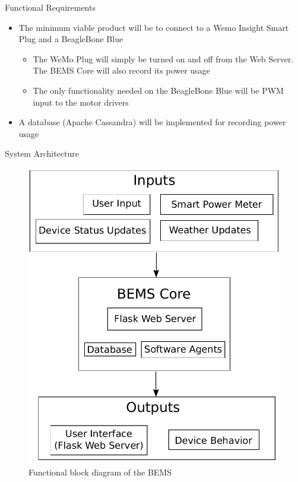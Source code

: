 \documentclass{beamer}
\begin{document}
\begin{frame}{Functional Requirements}{}
    \begin{itemize}
        \item The minimum viable product will be to connect to a Wemo Insight Smart Plug and a BeagleBone Blue
        \begin{itemize}
            \item The WeMo Plug will simply be turned on and off from the Web Server. The BEMS Core will also record its power usage
            \item The only functionality needed on the BeagleBone Blue will be PWM input to the motor drivers
        \end{itemize}
        \item A database (Apache Cassandra) will be implemented for recording power usage
    \end{itemize}
\end{frame}

\begin{frame}{System Architecture}{}
    \begin{figure}
        \centering
        \includegraphics[scale=0.4]{figs/functionalBlockDiagram.pdf}
        \caption{Functional block diagram of the BEMS}
        \label{fig:my_label}
    \end{figure}
\end{frame}
\end{document}
